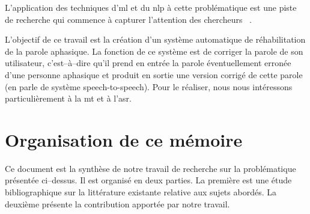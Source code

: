 L'application des techniques d'\gls{ml} et du \gls{nlp} à cette problématique est une piste de recherche 
qui commence à capturer l'attention des chercheurs%
~\cite{Smaili_Langlois_Pribil_2022,Qin_Lee_Kong_Lin_2022,Misra_Mishra_Gandhi_2022,%
Li_Knopman_Xu_Cohen_Pakhomov_2022,Misra_Mishra_Gandhi_2022}.

L'objectif de ce travail est la création d'un système automatique de réhabilitation de la parole aphasique.
La fonction de ce système est de corriger la parole de son utilisateur, 
c'est--à--dire qu'il prend en entrée la parole éventuellement erronée d'une personne aphasique
et produit en sortie une version corrigé de cette parole 
(en parle de système \foreignlanguage{english}{speech-to-speech}).
Pour le réaliser, nous nous intéressons particulièrement à la \gls{mt} et à l'\gls{asr}.

\section*{Organisation de ce mémoire}

Ce document est la synthèse de notre travail de recherche sur la problématique présentée ci--dessus.
Il est organisé en deux parties.
La première est une étude bibliographique sur la littérature existante relative aux sujets abordés.
La deuxième présente la contribution apportée par notre travail.

\subsection*{}

